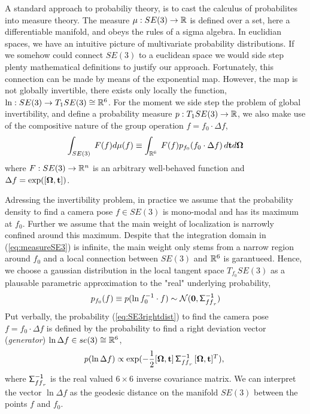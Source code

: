 \documentclass[conference]{IEEEtran}
\newcommand{\real}{\Bbb R}
\newcommand{\bfOmega}{\boldsymbol{\Omega}}
\newcommand{\sigmaff}{\mathsf{\Sigma^{-1}_\mathnormal{{ff}_r}}}
\newcommand{\beq}{\begin{equation}}
\newcommand{\eeq}{\end{equation}}
\begin{document}
A standard approach to probabiliy theory, is to cast the calculus of probabilites into measure theory. The measure $\mu:SE(3)\rightarrow\real$ is defined over a set, here a differentiable manifold, and obeys the rules of a sigma algebra. In euclidian spaces, we have an intuitive picture of multivariate probability distributions. If we somehow could connect $SE(3)$ to a euclidean space we would side step plenty mathematical definitions to justify our approach. Fortunately, this connection can be made by means of the exponential map. However, the map is not globally invertible, there exists only locally the function, $\ln: SE(3) \rightarrow T_{1}SE(3)\cong \real^6$. For the moment we side step the problem of global invertibility, and define a probability measure $p:T_{1}SE(3)\rightarrow \real$, we also make use of the compositive nature of the group operation $f = f_0\cdot \Delta f$,
\beq
    \int_{SE(3)} \; F( f ) d\mu(f) \equiv \int_{\real^6} \; F( f ) p_{f_0}(f_0 \cdot \Delta f)\,
    d{\bf t}d\bfOmega
    \label{eq:measureSE3}
\eeq
where $F:SE(3)\rightarrow\real^n$ is an arbitrary well-behaved function and $\Delta f = \exp([\bfOmega,{\bf t}])$.

Adressing the invertibility problem, in practice we assume that the probability density to find a
camera pose $f\in SE(3)$ is mono-modal and has its maximum at $f_0$. Further we assume that
the main weight of localization is narrowly confined around this maximum. Despite that the integration
domain in (\ref{eq:measureSE3}) is infinite, the main weight only stems from a narrow region around $f_0$ and
a local connection between $SE(3)$ and $\real^6$ is garantueed. Hence, we choose
a gaussian distribution in the local tangent space $T_{f_0}SE(3)$ as a plausable parametric approximation
to the "real" underlying probability,
\beq
     p_{f_0}(f) \equiv p(\ln f_0^{-1}\cdot f ) \sim {\cal N}( {\bf 0}, \sigmaff )
    \label{eq:SE3rightdist}
\eeq
Put verbally, the probability (\ref{eq:SE3rightdist}) to find the camera pose $f = f_0 \cdot \Delta f$
is defined by the probability to find a right deviation vector ({\em generator}) $\ln \Delta f \in se(3) \cong \real^6$,
\beq
    p(\ln\Delta f) \propto \exp( -{1\over 2} [{\bfOmega},{\bf t}]\, \sigmaff \, [{\bfOmega},{\bf t}]^T ),\;
     \label{eq:SE3rightdistexplicit}
\eeq
where $\sigmaff$ is the real valued $6\times 6$ inverse covariance matrix. 
We can interpret the vector $\ln \Delta f$ as the geodesic distance on the
manifold $SE(3)$ between the points $f$ and $f_0$.
\end{document}
